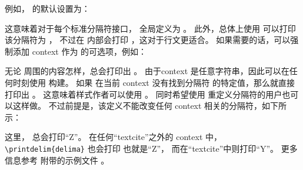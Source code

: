 例如， 的默认设置为：

\begin{ltxexample}[style=latex]{}
\end{ltxexample}
%
这意味着对于每个标准分隔符接口， 全局定义为 。
此外，总体上使用  可以打印该分隔符为 ，
不过在  内部会打印 ，这对于行文更适合。
如果需要的话，可以强制添加 context 作为 的可选项，例如：

\begin{ltxexample}[style=latex]{}
\end{ltxexample}
%
无论  周围的内容怎样，总会打印出 。
由于context 是任意字符串，因此可以在任何时刻使用  构建。
如果  在当前 context 没有找到分隔符  的特定值，那么就直接打印出 。
这意味着样式作者可以使用 。
同时希望使用  重定义分隔符的用户也可以这样做。
不过前提是，该定义不能改变任何 context 相关的分隔符，如下所示：

\begin{ltxexample}[style=latex]{}
\renewcommand*{\delima}{Z}
\end{ltxexample}
%
这里， 总会打印“Z”。
在任何“textcite”之外的 context 中，\verb+\printdelim{delima}+ 也会打印  也就是“Z”，
而在“textcite”中则打印“Y”。
更多信息参考 \biblatex 附带的示例文件 。

